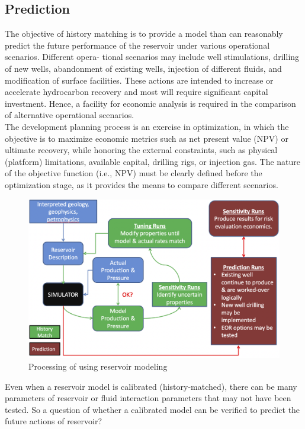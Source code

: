 \documentclass[12pt,a4paper]{report}
\begin{document}
\subsection{Prediction}
The objective of history matching is to provide a model than can reasonably predict the future performance of the reservoir under various operational scenarios. Different opera- tional scenarios may include well stimulations, drilling of new wells, abandonment of existing wells, injection of different fluids, and modification of surface facilities. These actions are intended to increase or accelerate hydrocarbon recovery and most will require significant capital investment. Hence, a facility for economic analysis is required in the comparison of alternative operational scenarios.\\
The development planning process is an exercise in optimization, in which the objective is to maximize economic metrics such as net present value (NPV) or ultimate recovery, while honoring the external constraints, such as physical (platform) limitations, available capital, drilling rigs, or injection gas. The nature of the objective function (i.e., NPV) must be clearly defined before the optimization stage, as it provides the means to compare different scenarios.\\
\begin{figure}[H]
\centering
\includegraphics[scale = 0.5]{Fig_theo/simulation}
\caption{Processing of using reservoir modeling}
\end{figure}
Even when a reservoir model is calibrated (history-matched), there can be many parameters of reservoir or fluid interaction parameters that may not have been tested. So a question of whether a calibrated model can be verified to predict the future actions of reservoir?
\end{document}
